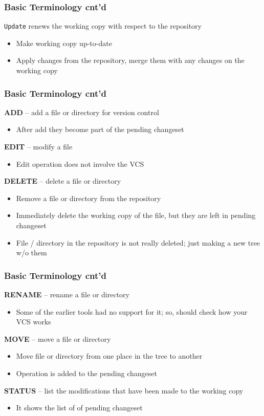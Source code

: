\documentclass[newPxFont,sthlmFooter,nooffset]{beamer}
\begin{document}
\begin{frame}[t]
  \frametitle{Basic Terminology cnt'd}

\texttt{Update} renews the working copy with respect to the repository
\begin{itemize}
\item Make working copy up-to-date
\item Apply changes from the repository, merge them with any changes on the working copy

\end{itemize}


\end{frame}


\begin{frame}[t]
  \frametitle{Basic Terminology cnt'd}
\textbf{ADD} – add a file or directory for version control
\begin{itemize}
\item After add they become part of the pending changeset
\end{itemize}


\textbf{EDIT} – modify a file
\begin{itemize}
\item Edit operation does not involve the VCS
\end{itemize}


\textbf{DELETE} – delete a file or directory
\begin{itemize}
\item Remove a file or directory from the repository
\item Immediately delete the working copy of the file, but they are left in pending changeset
\item File / directory in the repository is not really deleted; just making a new tree w/o them
\end{itemize}


\end{frame}


\begin{frame}[t]
  \frametitle{Basic Terminology cnt'd}
\textbf{RENAME} – rename a file or directory
\begin{itemize}
\item Some of the earlier tools had no support for it; so, should check how your VCS works
\end{itemize}



\textbf{MOVE} – move a file or directory
\begin{itemize}
\item Move file or directory from one place in the tree to another
\item Operation is added to the pending changeset
\end{itemize}

\textbf{STATUS} – list the modifications that have been made to the working copy
\begin{itemize}
\item It shows the list of of pending changeset
\end{itemize}




\end{frame}
\end{document}
